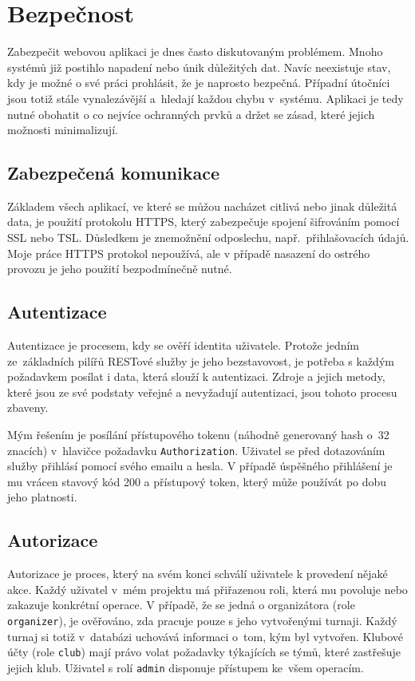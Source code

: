 \section{Bezpečnost}


Zabezpečit webovou aplikaci je dnes často diskutovaným problémem. Mnoho systémů již postihlo napadení
nebo únik důležitých dat. Navíc neexistuje stav, kdy je možné o své práci prohlásit, že je naprosto
bezpečná. Případní útočníci jsou totiž stále vynalezávější a~hledají každou chybu v~systému.
Aplikaci je tedy nutné obohatit o co nejvíce ochranných prvků a držet se zásad,
které jejich možnosti minimalizují.

\subsection{Zabezpečená komunikace}

Základem všech aplikací, ve které se můžou nacházet citlivá nebo jinak důležitá data,
je použití protokolu HTTPS, který zabezpečuje spojení šifrováním pomocí SSL nebo TSL.
Důsledkem je znemožnění odposlechu, např.~přihlašovacích údajů. Moje práce HTTPS protokol nepoužívá,
ale v případě nasazení do ostrého provozu je jeho použití bezpodmínečně nutné.

\subsection{Autentizace}

Autentizace je procesem, kdy se ověří identita uživatele. Protože jedním ze~základních pilířů RESTové
služby je jeho bezstavovost, je potřeba s každým požadavkem posílat i data, která slouží k autentizaci.
Zdroje a jejich metody, které jsou ze své podstaty veřejné a nevyžadují autentizaci, jsou tohoto procesu zbaveny.

Mým řešením je posílání přístupového tokenu (náhodně generovaný hash o~32 znacích) v~hlavičce požadavku
\texttt{Authorization}. Uživatel se před dotazováním služby přihlásí pomocí svého emailu a hesla.
V případě úspěšného přihlášení je mu vrácen stavový kód 200 a přístupový token, který může používát po dobu jeho platnosti.

\subsection{Autorizace}

Autorizace je proces, který na svém konci schválí uživatele k provedení nějaké akce. Každý uživatel
v~mém projektu má přiřazenou roli, která mu povoluje nebo zakazuje konkrétní operace. V případě, že
se jedná o organizátora (role \texttt{organizer}), je ověřováno, zda pracuje pouze s jeho vytvořenými turnaji.
Každý turnaj si totiž v~databázi uchovává informaci o~tom, kým byl vytvořen. Klubové účty
(role \texttt{club}) mají právo volat požadavky týkajících se týmů, které zastřešuje jejich klub.
Uživatel s rolí \texttt{admin} disponuje přístupem ke~všem operacím.

